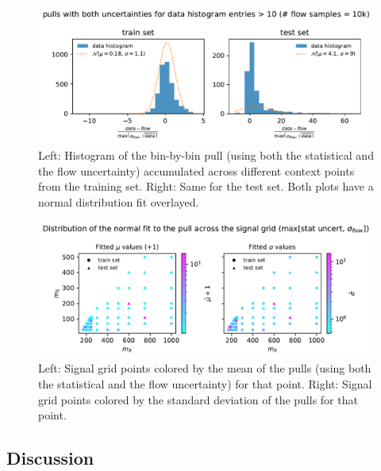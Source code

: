 \documentclass[
  11pt,
  numbers=noendperiod]{book}
\begin{document}
\begin{figure}

{\centering \includegraphics{./images/sh/sh-pulls-stats-and-flow-more-data.pdf}

}

\caption{\label{fig-pulls-sh-both}Left: Histogram of the bin-by-bin pull
(using both the statistical and the flow uncertainty) accumulated across
different context points from the training set. Right: Same for the test
set. Both plots have a normal distribution fit overlayed.}

\end{figure}

\begin{figure}

{\centering \includegraphics{./images/sh/pull-dist-both.pdf}

}

\caption{\label{fig-pull-dist-both}Left: Signal grid points colored by
the mean of the pulls (using both the statistical and the flow
uncertainty) for that point. Right: Signal grid points colored by the
standard deviation of the pulls for that point.}

\end{figure}

\hypertarget{discussion}{%
\subsection{Discussion}\label{discussion}}
\end{document}
